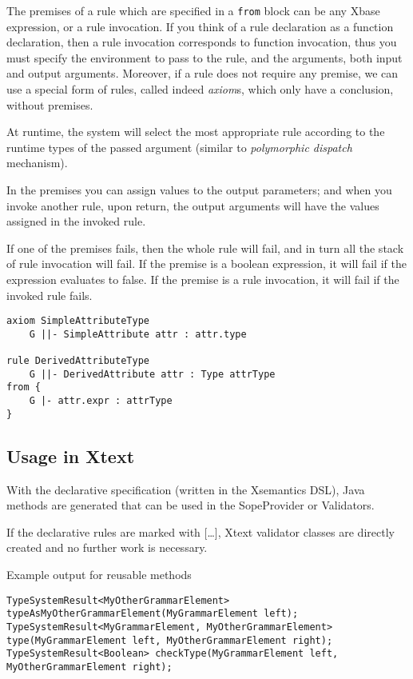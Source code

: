 The premises of a rule which are specified in a \verb|from| block can be any
Xbase expression, or a rule invocation.  If you think of a rule declaration as a
function declaration, then a rule invocation corresponds to function invocation,
thus you must specify the environment to pass to the rule, and the arguments,
both input and output arguments.
Moreover, if a rule does not require any premise, we can use a special form of
rules, called indeed \textit{axiom}s, which only have a conclusion, without
premises.

At runtime, the system will select the most appropriate rule according
to the runtime types of the passed argument (similar to
\textit{polymorphic dispatch} mechanism).

In the premises you can assign values to the output parameters; and
when you invoke another rule, upon return, the output arguments will have
the values assigned in the invoked rule.

If one of the premises fails, then the whole rule will fail, and in turn all the
stack of rule invocation will fail.  If the premise is a boolean expression, it
will fail if the expression evaluates to false.  If the premise is a rule
invocation, it will fail if the invoked rule fails.

\begin{lstlisting}[language=xsemantics]
axiom SimpleAttributeType
	G ||- SimpleAttribute attr : attr.type

rule DerivedAttributeType
	G ||- DerivedAttribute attr : Type attrType
from {
	G |- attr.expr : attrType
}
\end{lstlisting}

\subsection{Usage in Xtext}

With the declarative specification (written in the Xsemantics DSL), Java methods are generated that can be used in the SopeProvider or Validators. 

If the declarative rules are marked with […], Xtext validator classes are directly created and no further work is necessary.

Example output for reusable methods

\begin{lstlisting}
TypeSystemResult<MyOtherGrammarElement> typeAsMyOtherGrammarElement(MyGrammarElement left); 
TypeSystemResult<MyGrammarElement, MyOtherGrammarElement> type(MyGrammarElement left, MyOtherGrammarElement right); 
TypeSystemResult<Boolean> checkType(MyGrammarElement left, MyOtherGrammarElement right); 
\end{lstlisting}
